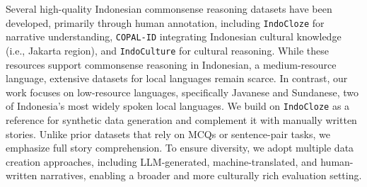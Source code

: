 

Several high-quality Indonesian commonsense reasoning datasets have been developed, primarily through human annotation, including \texttt{IndoCloze} \cite{koto-etal-2022-cloze} for narrative understanding, \texttt{COPAL-ID} \cite{wibowo-etal-2024-copal} integrating Indonesian cultural knowledge (i.e., Jakarta region), and \texttt{IndoCulture} \cite{koto-etal-2024-indoculture} for cultural reasoning. While these resources support commonsense reasoning in Indonesian, a medium-resource language, extensive datasets for local languages remain scarce. In contrast, our work focuses on low-resource languages, specifically Javanese and Sundanese, two of Indonesia’s most widely spoken local languages. We build on \texttt{IndoCloze} as a reference for synthetic data generation and complement it with manually written stories. Unlike prior datasets that rely on MCQs or sentence-pair tasks, we emphasize full story comprehension. To ensure diversity, we adopt multiple data creation approaches, including LLM-generated, machine-translated, and human-written narratives, enabling a broader and more culturally rich evaluation setting.



